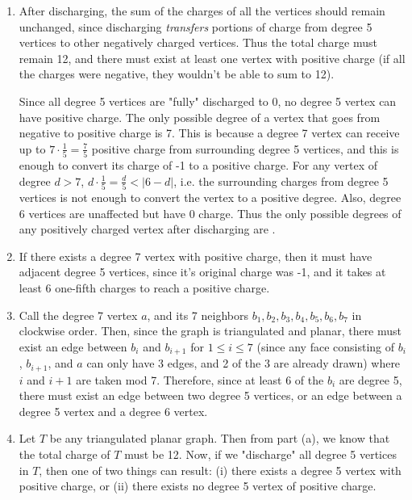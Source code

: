 \begin{enumerate}
\begin{enumerate}
        \item After discharging, the sum of the charges of all the vertices should remain unchanged, since discharging \textit{transfers} portions of charge from degree 5 vertices to other negatively charged vertices. Thus the total charge must remain 12, and there must exist at least one vertex with positive charge (if all the charges were negative, they wouldn't be able to sum to 12).
        
        Since all degree 5 vertices are "fully" discharged to 0, no degree 5 vertex can have positive charge. The only possible degree of a vertex that goes from negative to positive charge is 7. This is because a degree 7 vertex can receive up to $7\cdot\frac{1}{5}=\frac{7}{5}$ positive charge from surrounding degree 5 vertices, and this is enough to convert its charge of -1 to a positive charge. For any vertex of degree $d>7$, $d\cdot\frac{1}{5}=\frac{d}{5}<|6-d|$, i.e. the surrounding charges from degree 5 vertices is not enough to convert the vertex to a positive degree. Also, degree 6 vertices are unaffected but have 0 charge. Thus the only possible degrees of any positively charged vertex after discharging are .
        
        \item If there exists a degree 7 vertex with positive charge, then it must have  adjacent degree 5 vertices, since it's original charge was -1, and it takes at least 6 one-fifth charges to reach a positive charge.
        
        \item Call the degree 7 vertex $a$, and its 7 neighbors $b_1,b_2,b_3,b_4,b_5,b_6,b_7$ in clockwise order. Then, since the graph is triangulated and planar, there must exist an edge between $b_i$ and $b_{i+1}$ for $1\leq i\leq 7$ (since any face consisting of $b_i$, $b_{i+1}$, and $a$ can only have 3 edges, and 2 of the 3 are already drawn) where $i$ and $i+1$ are taken mod 7. Therefore, since at least 6 of the $b_i$ are degree 5, there must exist an edge between two degree 5 vertices, or an edge between a degree 5 vertex and a degree 6 vertex.
        
        \item Let $T$ be any triangulated planar graph. Then from part (a), we know that the total charge of $T$ must be 12. Now, if we "discharge" all degree 5 vertices in $T$, then one of two things can result: (i) there exists a degree 5 vertex with positive charge, or (ii) there exists no degree 5 vertex of positive charge. 
        

\end{enumerate}
\end{enumerate}

